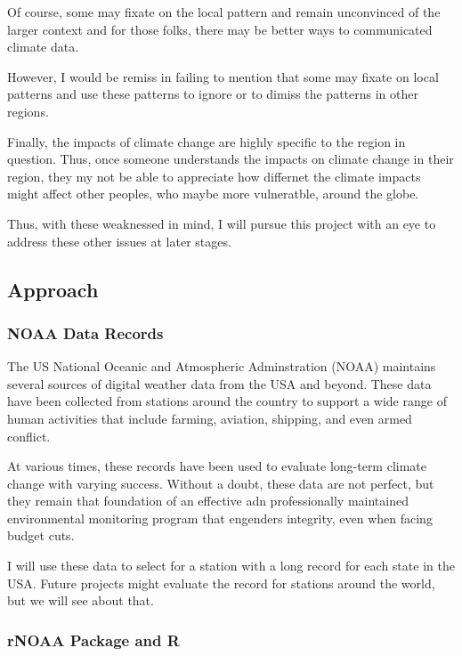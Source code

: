 \documentclass{article}\usepackage[]{graphicx}\usepackage[]{color}
\begin{document}
Of course, some may fixate on the local pattern and remain unconvinced of the larger context and for those folks, there may be better ways to communicated climate data. 

However, I would be remiss in failing to mention that some may fixate on local patterns and use these patterns to ignore or to dimiss the patterns in other regions. 

Finally, the impacts of climate change are highly specific to the region in question. Thus, once someone understands the impacts on climate change in their region, they my not be able to appreciate how differnet the climate impacts might affect other peoples, who maybe more vulneratble, around the globe. 

Thus, with these weaknessed in mind, I will pursue this project with an eye to address these other issues at later stages.

\subsection{Approach}

\subsubsection{NOAA Data Records}

The US National Oceanic and Atmospheric Adminstration (NOAA) maintains several sources of digital weather data from the USA and beyond. These data have been collected from stations around the country to support a wide range of human activities that include farming, aviation, shipping, and even armed conflict. 

At various times, these records have been used to evaluate long-term climate change with varying success. Without a doubt, these data are not perfect, but they remain that foundation of an effective adn professionally maintained environmental monitoring program that engenders integrity, even when facing budget cuts. 

I will use these data to select for a station with a long record for each state in the USA. Future projects might evaluate the record for stations around the world, but we will see about that. 


\subsubsection{rNOAA Package and R}
\end{document}

